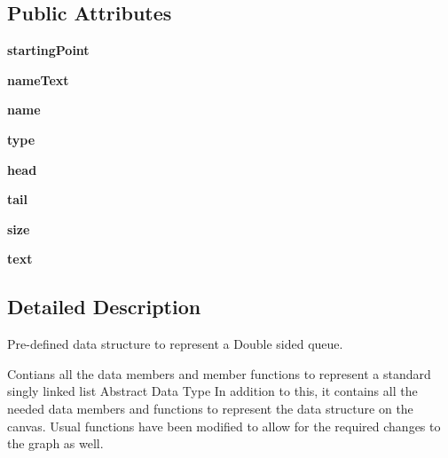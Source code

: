 \subsection*{Public Attributes}
\begin{DoxyCompactItemize}
\item 
\mbox{\label{class_queue_1_1_queue_ab4a0969d72be3d0fb08e02a33a985640}} 
{\bfseries starting\+Point}
\item 
\mbox{\label{class_queue_1_1_queue_a692f39189799e9729806e99e59dff97d}} 
{\bfseries name\+Text}
\item 
\mbox{\label{class_queue_1_1_queue_abd20d1d760a1275d551b4eebd709c110}} 
{\bfseries name}
\item 
\mbox{\label{class_queue_1_1_queue_a1e239f58b74790246aeec49e81f9052d}} 
{\bfseries type}
\item 
\mbox{\label{class_queue_1_1_queue_a9a2010a83cf36c0d23c2d90396cd3796}} 
{\bfseries head}
\item 
\mbox{\label{class_queue_1_1_queue_a70d68f8c761879b479bac48d291c0671}} 
{\bfseries tail}
\item 
\mbox{\label{class_queue_1_1_queue_a88cc9ea7e3c5ad6afb3635b1f493bfcd}} 
{\bfseries size}
\item 
\mbox{\label{class_queue_1_1_queue_a13809fa8a00047c724274dc36d7255e0}} 
{\bfseries text}
\end{DoxyCompactItemize}


\subsection{Detailed Description}
Pre-\/defined data structure to represent a Double sided queue. 

Contians all the data members and member functions to represent a standard singly linked list Abstract Data Type In addition to this, it contains all the needed data members and functions to represent the data structure on the canvas. Usual functions have been modified to allow for the required changes to the graph as well. 

